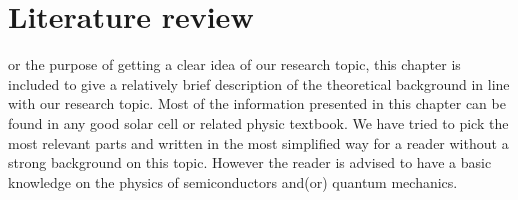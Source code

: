 \let\textcircled=\pgftextcircled
\chapter{Literature review}
\label{chap:litrev}
or the purpose of getting a clear idea of our research topic, this chapter is included to give a relatively brief description of the theoretical background in line with our research topic. Most of the information presented in this chapter can be found in any good solar cell or related physic textbook. We have tried to pick the most relevant parts and written in the most simplified way for a reader without a strong background on this topic. However the reader is advised to have a basic knowledge on the physics of semiconductors and(or) quantum mechanics.























